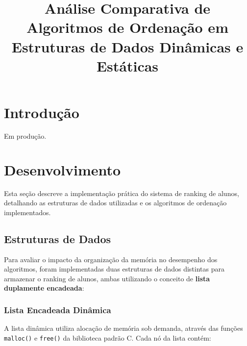 \documentclass[conference]{IEEEtran}
\begin{document}
\title{Análise Comparativa de Algoritmos de Ordenação em Estruturas de Dados Dinâmicas e Estáticas}

\author{
}

\maketitle

\section{Introdução}

Em produção.

\section{Desenvolvimento}

Esta seção descreve a implementação prática do sistema de ranking de alunos, detalhando as estruturas de dados utilizadas e os algoritmos de ordenação implementados.

\subsection{Estruturas de Dados}

Para avaliar o impacto da organização da memória no desempenho dos algoritmos, foram implementadas duas estruturas de dados distintas para armazenar o ranking de alunos, ambas utilizando o conceito de \textbf{lista duplamente encadeada}:

\subsubsection{Lista Encadeada Dinâmica}

A lista dinâmica utiliza alocação de memória sob demanda, através das funções \texttt{malloc()} e \texttt{free()} da biblioteca padrão C. Cada nó da lista contém:
\end{document}

